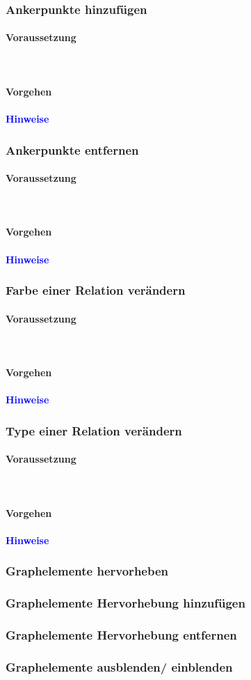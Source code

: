 \documentclass[enabledeprecatedfontcommands,fontsize=11pt,paper=a4,twoside]{scrartcl}
\newcommand*{\hint}{\paragraph{\textcolor{blue}{Hinweise}}}
\newcommand*{\condition}{\paragraph{Voraussetzung}$\;$ \vspace{0.2cm}\\}
\newcommand*{\action}{\paragraph{Vorgehen}}
\begin{document}
		\subsubsection{Ankerpunkte hinzufügen}
		\condition
		\action
		\hint
		
		\subsubsection{Ankerpunkte entfernen}
		\condition
		\action
		\hint
		
		\subsubsection{Farbe einer Relation verändern}
		\condition
		\action
		\hint
		
		\subsubsection{Type einer Relation verändern}
		\condition
		\action
		\hint
		
		
		\subsubsection{Graphelemente hervorheben}
		\subsubsection{Graphelemente Hervorhebung hinzufügen}
		\subsubsection{Graphelemente Hervorhebung entfernen}
		
		\subsubsection{Graphelemente ausblenden/ einblenden}
\end{document}
